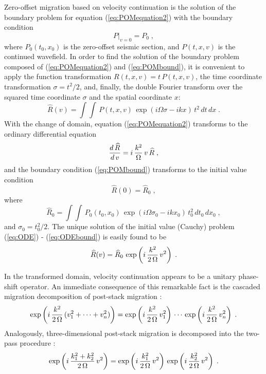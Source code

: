 Zero-offset migration based on velocity continuation is the solution
of the boundary problem for equation (\ref{eq:POMequation2}) with the
boundary condition
\begin{equation}
\left.P\right|_{v=0} = P_0\;,
\label{eq:POMbound} 
\end{equation}
where $P_0(t_0,x_0)$ is the zero-offset seismic section, and
$P(t,x,v)$ is the continued wavefield. In order to find the solution
of the boundary problem composed of (\ref{eq:POMequation2}) and
(\ref{eq:POMbound}), it is convenient to apply the function
transformation $R(t,x,v) = t\,P(t,x,v)$, the time coordinate
transformation $\sigma = t^2/2$, and, finally, the double Fourier
transform over the squared time coordinate $\sigma$ and the spatial
coordinate $x$:
\begin{equation}
\widehat{R}(v) = \int \int\,P(t,x,v)\,
\exp(i \Omega \sigma - i k x )\,t^2\,dt\,dx\;.
\label{eq:FTK} 
\end{equation}
With the change of domain, equation (\ref{eq:POMequation2}) transforms
to the ordinary differential equation
\begin{equation}
{{d\,\widehat{R}} \over {d\,v}} = 
i\,{k^2 \over \Omega}\,v\,\widehat{R}\;,
\label{eq:ODE} 
\end{equation}
and the boundary condition (\ref{eq:POMbound}) transforms to the initial
value condition
\begin{equation}
\widehat{R}(0) = \widehat{R}_0\;, 
\label{eq:ODEbound} 
\end{equation}
where 
\begin{equation}
\widehat{R}_0 = \int \int\,P_0(t_0,x_0)\,
\exp(i \Omega \sigma_0 - i k x_0 )\,t_0^2\,dt_0\,dx_0\;,
\label{eq:FTK0}
\end{equation}
and $\sigma_0 = t_0^2/2$.  The unique solution of the initial value
(Cauchy) problem (\ref{eq:ODE}) - (\ref{eq:ODEbound}) is easily found to be
\begin{equation}
\widehat{R}(v) = \widehat{R}_0\,
\exp\left( i\,{{k^2} \over {2\,\Omega}}\,v^2\right)\;.
\label{eq:ODEsolution} 
\end{equation}

In the transformed domain, velocity continuation appears to be a unitary
phase-shift operator. An immediate consequence of this remarkable fact is the
cascaded migration decomposition of post-stack migration
\cite[]{GEO52.05.06180643}:
\begin{equation}
\exp\left( i\,{{k^2} \over {2\,\Omega}}\,
(v_1^2 +  \cdots + v_n^2)\right) =
\exp\left( i\,{{k^2} \over {2\,\Omega}}\,v_1^2\right)\,\cdots\,
\exp\left( i\,{{k^2} \over {2\,\Omega}}\,v_n^2\right)\;.
\label{eq:cascaded} 
\end{equation}
Analogously, three-dimensional post-stack migration is decomposed
into the two-pass procedure \cite[]{GPR31.01.00340056}:
\begin{equation}
\exp\left( i\,{{k_1^2+k_2^2} \over {2\,\Omega}}\,v^2\right) =
\exp\left( i\,{{k_1^2} \over {2\,\Omega}}\,v^2\right)\,
\exp\left( i\,{{k_2^2} \over {2\,\Omega}}\,v^2\right)\;.
\label{eq:two-pass}
\end{equation}

